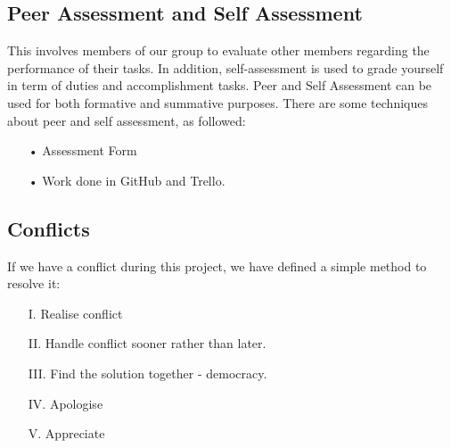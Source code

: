 \documentclass[11pt]{article}
\begin{document}
\subsection{Peer Assessment and Self Assessment}
This involves members of our group to evaluate other members regarding the performance of
their tasks. In addition, self-assessment is used to grade yourself in term of duties and
accomplishment tasks. Peer and Self Assessment can be used for both formative and summative
purposes. There are some techniques about peer and self assessment, as followed:
\begin{itemize}
\item[•] Assessment Form
\item[•] Work done in GitHub and Trello.  
\end{itemize}

\subsection{Conflicts}
If we have a conflict during this project, we have defined a simple method to resolve it: 
\begin{itemize}
\item[I. ]Realise conflict
\item[II. ] Handle conflict sooner rather than later.
\item[III. ] Find the solution together - democracy.
\item[IV. ] Apologise
\item[V. ] Appreciate
\end{itemize}
\end{document}
